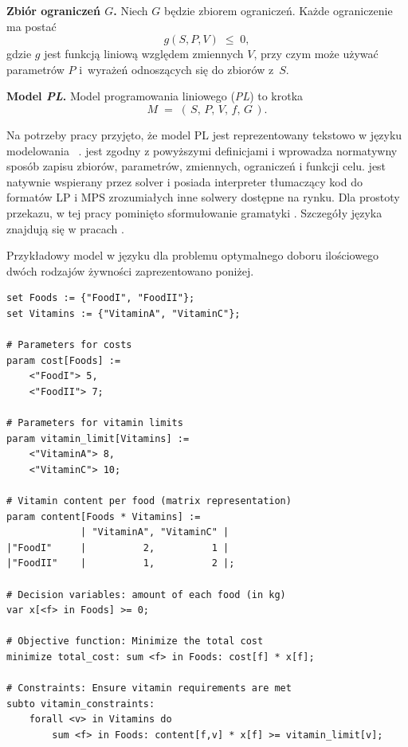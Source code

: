 \textbf{Zbiór ograniczeń \boldmath$G$.}
Niech $G$ będzie zbiorem ograniczeń. Każde ograniczenie ma postać
\[
g(S,P,V) \;\leq\; 0,
\]
gdzie $g$ jest funkcją liniową względem zmiennych $V$, przy czym może używać parametrów $P$ i~wyrażeń odnoszących się do zbiorów z~$S$.

\textbf{Model \textit{PL}.}
Model programowania liniowego (\textit{PL}) to krotka
\[
M \;=\; (\,S,\,P,\,V,\,f,\,G\,).
\]

Na potrzeby pracy przyjęto, że model PL jest reprezentowany tekstowo w języku modelowania ~\cite{zimpl_manual}.  jest zgodny z powyższymi definicjami i wprowadza normatywny sposób zapisu zbiorów, parametrów, zmiennych, ograniczeń i funkcji celu.  jest natywnie wspierany przez solver  \cite{scip_documentation} i posiada interpreter tłumaczący kod  do formatów LP i MPS zrozumiałych inne solwery dostępne na rynku. Dla prostoty przekazu, w tej pracy pominięto sformułowanie gramatyki . Szczegóły języka  znajdują się w pracach \cite{zimpl_manual,Koch2005}.

Przykładowy model  w języku  dla problemu optymalnego doboru ilościowego dwóch rodzajów żywności zaprezentowano poniżej.
\begin{lstlisting}[language=zimpl]
set Foods := {"FoodI", "FoodII"};
set Vitamins := {"VitaminA", "VitaminC"};

# Parameters for costs
param cost[Foods] := 
    <"FoodI"> 5, 
    <"FoodII"> 7;

# Parameters for vitamin limits
param vitamin_limit[Vitamins] := 
    <"VitaminA"> 8, 
    <"VitaminC"> 10;

# Vitamin content per food (matrix representation)
param content[Foods * Vitamins] :=
             | "VitaminA", "VitaminC" |
|"FoodI"     |          2,          1 |
|"FoodII"    |          1,          2 |;

# Decision variables: amount of each food (in kg)
var x[<f> in Foods] >= 0;

# Objective function: Minimize the total cost
minimize total_cost: sum <f> in Foods: cost[f] * x[f];

# Constraints: Ensure vitamin requirements are met
subto vitamin_constraints: 
    forall <v> in Vitamins do
        sum <f> in Foods: content[f,v] * x[f] >= vitamin_limit[v];

\end{lstlisting}

